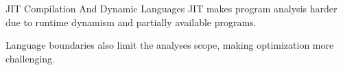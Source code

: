 \begin{roundedbeamerblock}{JIT Compilation And Dynamic Languages}
    \vspace{5mm}
    JIT makes program analysis harder due to runtime dynamism and partially available programs.\par
    \vspace{5mm}
    Language boundaries also limit the analyses scope, making optimization more challenging.\par
    \vspace{5mm}

\end{roundedbeamerblock}
